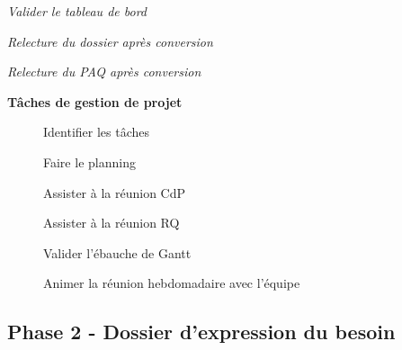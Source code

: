 \begin{description}
\begin{description}
\begin{description}
                \end{description}
            \item[\textbullet] \it{Valider le tableau de bord}
            \item[\textbullet] \it{Relecture du dossier après conversion}
            \item[\textbullet] \it{Relecture du PAQ après conversion} \\
        \end{description}
    \item[] \bf{Tâches de gestion de projet}
        \begin{description}
            \item[\textbullet] Identifier les tâches
            \item[\textbullet] Faire le planning
            \item[\textbullet] Assister à la réunion CdP
            \item[\textbullet] Assister à la réunion RQ
            \item[\textbullet] Valider l'ébauche de Gantt
            \item[\textbullet] Animer la réunion hebdomadaire avec l’équipe
        \end{description}
\end{description}

\subsection{Phase 2 - Dossier d’expression du besoin}

